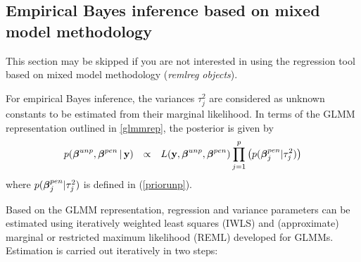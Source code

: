 \documentclass[11pt,a4paper,twoside]{bayesxarticle}
\begin{document}
\subsection{Empirical Bayes inference based on mixed model methodology}
\label{glmmmeth}

This section may be skipped if you are not interested in using the
regression tool based on mixed model methodology ({\em remlreg
objects}).

For empirical Bayes inference, the variances $\tau^2_j$ are
considered as unknown constants to be estimated from their marginal
likelihood. In terms of the GLMM representation outlined in
\autoref{glmmrep}, the posterior is given by
\begin{equation}
\label{posterior2}
\begin{array}{lll}
 p(\betavec^{unp},\betavec^{pen}\, | \, \yvec) & \propto & L( \yvec,\betavec^{unp},\betavec^{pen})
\displaystyle \prod_{j=1}^p \left( p(\betavec_j^{pen}|\tau_j^2)  \right) \\
 \end{array}
\end{equation}
where $p(\boldsymbol{\beta}_j^{pen}|\tau_j^2)$ is defined in (\ref{priorunp}).

Based on the GLMM representation, regression and variance parameters
can be estimated using iteratively weighted least squares (IWLS) and
(approximate) marginal or restricted maximum likelihood (REML)
developed for GLMMs. Estimation is carried out iteratively in two
steps:
\end{document}
